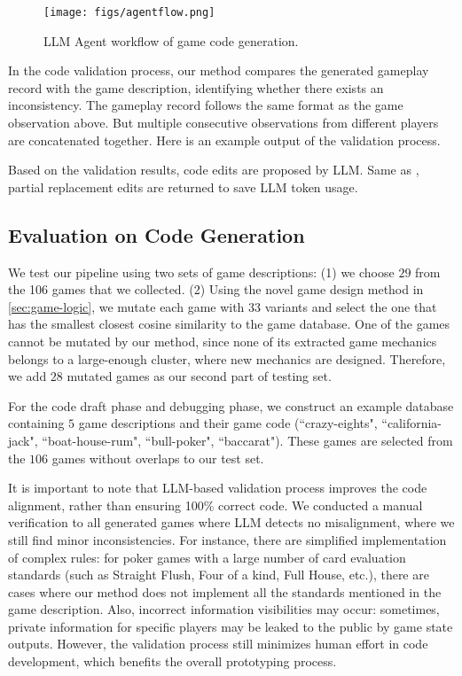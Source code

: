 \begin{figure*}[ht]
  \centering
  \texttt{[image: figs/agentflow.png]}
  \caption{LLM Agent workflow of game code generation.}\label{fig:agentflow}
\end{figure*}

In the code validation process, our method compares the generated gameplay record with the game description, identifying whether there exists an inconsistency. The gameplay record follows the same format as the game observation above. But multiple consecutive observations from different players are concatenated together. Here is an example output of the validation process.



Based on the validation results, code edits are proposed by LLM. Same as \cite{agentless}, partial replacement edits are returned to save LLM token usage.



\subsection{Evaluation on Code Generation}
\label{sup:test-case}
We test our pipeline using two sets of game descriptions: (1) we choose $29$ from the 106 games that we collected. (2) Using the novel game design method in \ref{sec:game-logic}, we mutate each game with $33$ variants and select the one that has the smallest closest cosine similarity to the game database. One of the games cannot be mutated by our method, since none of its extracted game mechanics belongs to a large-enough cluster, where new mechanics are designed. Therefore, we add $28$ mutated games as our second part of testing set.

For the code draft phase and debugging phase, we construct an example database containing $5$ game descriptions and their game code (``crazy-eights", ``california-jack", ``boat-house-rum", ``bull-poker", ``baccarat"). These games are selected from the $106$ games without overlaps to our test set.

It is important to note that LLM-based validation process improves the code alignment, rather than ensuring 100\% correct code. We conducted a manual verification to all generated games where LLM detects no misalignment, where we still find minor inconsistencies. For instance, there are simplified implementation of complex rules: for poker games with a large number of card evaluation standards (such as Straight Flush, Four of a kind, Full House, etc.), there are cases where our method does not implement all the standards mentioned in the game description.
Also, incorrect information visibilities may occur: sometimes, private information for specific players may be leaked to the public by game state outputs.
However, the validation process still minimizes human effort in code development, which benefits the overall prototyping process.


